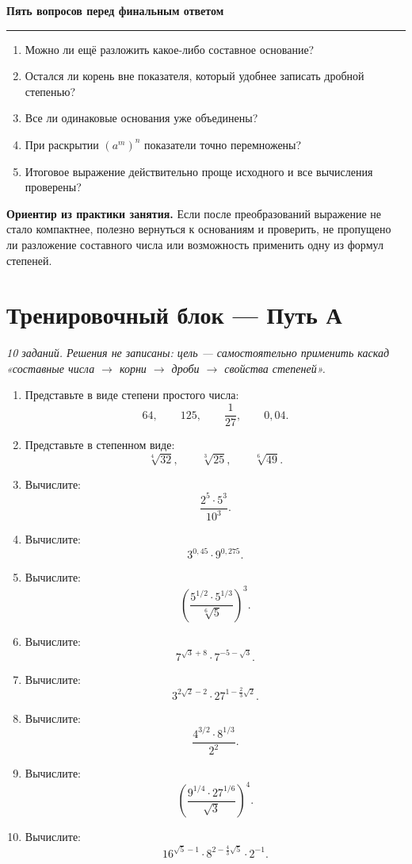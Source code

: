 \documentclass[a4paper,12pt]{article}
\newcommand{\topic}[1]{%
  \vspace{0.6em}
  {\large\bfseries\color{darkaccent}#1}\par
  \vspace{0.15em}\color{linegray}\hrule\color{textgray}\vspace{0.35em}
}
\newcommand{\keyidea}[1]{\textbf{\color{darkaccent}#1}}
\begin{document}
\topic{Пять вопросов перед финальным ответом}
\begin{enumerate}
  \item Можно ли ещё разложить какое-либо составное основание?
  \item Остался ли корень вне показателя, который удобнее записать дробной степенью?
  \item Все ли одинаковые основания уже объединены?
  \item При раскрытии \((a^m)^n\) показатели точно перемножены?
  \item Итоговое выражение действительно проще исходного и все вычисления проверены?
\end{enumerate}

\keyidea{Ориентир из практики занятия.} Если после преобразований выражение не стало компактнее, полезно вернуться к основаниям и проверить, не пропущено ли разложение составного числа или возможность применить одну из формул степеней.

\clearpage

\section*{Тренировочный блок --- Путь А}
\textit{10 заданий. Решения не записаны: цель --- самостоятельно применить каскад «составные числа \(\to\) корни \(\to\) дроби \(\to\) свойства степеней».}

\begin{enumerate}
  \item Представьте в виде степени простого числа:
  \[
  64,\qquad 125,\qquad \frac1{27},\qquad 0{,}04.
  \]

  \item Представьте в степенном виде:
  \[
  \sqrt[4]{32},\qquad \sqrt[3]{25},\qquad \sqrt[6]{49}.
  \]

  \item Вычислите:
  \[
  \frac{2^5\cdot5^3}{10^3}.
  \]

  \item Вычислите:
  \[
  3^{0{,}45}\cdot9^{0{,}275}.
  \]

  \item Вычислите:
  \[
  \left(\frac{5^{1/2}\cdot5^{1/3}}{\sqrt[6]{5}}\right)^3.
  \]

  \item Вычислите:
  \[
  7^{\sqrt3+8}\cdot7^{-5-\sqrt3}.
  \]

  \item Вычислите:
  \[
  3^{2\sqrt2-2}\cdot27^{1-\frac23\sqrt2}.
  \]

  \item Вычислите:
  \[
  \frac{4^{3/2}\cdot8^{1/3}}{2^2}.
  \]

  \item Вычислите:
  \[
  \left(\frac{9^{1/4}\cdot27^{1/6}}{\sqrt3}\right)^4.
  \]

  \item Вычислите:
  \[
  16^{\sqrt5-1}\cdot8^{2-\frac43\sqrt5}\cdot2^{-1}.
  \]
\end{enumerate}
\end{document}
